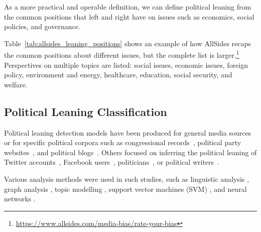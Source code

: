 As a more practical and operable definition, we can define political leaning from the common positions that left and right have on issues such as economics, social policies, and governance.

Table~\ref{tab:allsides_leaning_positions} shows an example of how AllSides recaps the common positions about different issues, but the complete list is larger.\footnote{\url{https://www.allsides.com/media-bias/rate-your-bias}}
Perspectives on multiple topics are listed: social issues, economic issues, foreign policy, environment and energy, healthcare, education, social security, and welfare.




\subsection{\statusgreen Political Leaning Classification}
\label{ssec:lit_leaning_classification}




Political leaning detection models have been produced for general media sources~\citep{budak} or for 
specific political corpora such as congressional records~\citep{gentzkow}, political party websites~\citep{yan2017perils}, and political blogs~\citep{ahmed201}.  
Others focused on inferring the political leaning of Twitter accounts~\citep{Cohen2013ClassifyingPO}, Facebook users~\citep{Bakshy1130}, politicians~\citep{thomas-etal-2006-get}, or political writers~\citep{iyyer-etal-2014-political}. 

Various analysis methods were used in such studies, such as linguistic analysis \citep{gentzkow}, graph analysis \citep{chen2017opinion}, topic modelling \citep{ahmed201, Cohen2013ClassifyingPO}, support vector machines (SVM) \citep{Bakshy1130,thomas-etal-2006-get}, and neural networks \citep{iyyer-etal-2014-political,baly2020we}.


